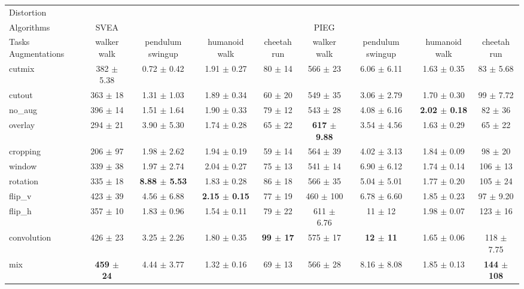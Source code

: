 \begin{tabular}{lcccccccc}
Distortion & & & & & & & & \\
Algorithms & SVEA & & & & PIEG & & & \\
Tasks Augmentations & walker walk & pendulum swingup & humanoid walk & cheetah run & walker walk & pendulum swingup & humanoid walk & cheetah run \\
cutmix          & 382 $\pm$ 5.38 & 0.72 $\pm$ 0.42 & 1.91 $\pm$ 0.27 & 80 $\pm$ 14 & 566 $\pm$ 23 & 6.06 $\pm$ 6.11 & 1.63 $\pm$ 0.35 & 83 $\pm$ 5.68 \\
cutout          & 363 $\pm$ 18 & 1.31 $\pm$ 1.03 & 1.89 $\pm$ 0.34 & 60 $\pm$ 20 & 549 $\pm$ 35 & 3.06 $\pm$ 2.79 & 1.70 $\pm$ 0.30 & 99 $\pm$ 7.72 \\
no\_aug         & 396 $\pm$ 14 & 1.51 $\pm$ 1.64 & 1.90 $\pm$ 0.33 & 79 $\pm$ 12 & 543 $\pm$ 28 & 4.08 $\pm$ 6.16 & \textbf{2.02 $\pm$ 0.18} & 82 $\pm$ 36 \\
overlay         & 294 $\pm$ 21 & 3.90 $\pm$ 5.30 & 1.74 $\pm$ 0.28 & 65 $\pm$ 22 & \textbf{617 $\pm$ 9.88} & 3.54 $\pm$ 4.56 & 1.63 $\pm$ 0.29 & 65 $\pm$ 22 \\
cropping        & 206 $\pm$ 97 & 1.98 $\pm$ 2.62 & 1.94 $\pm$ 0.19 & 59 $\pm$ 14 & 564 $\pm$ 39 & 4.02 $\pm$ 3.13 & 1.84 $\pm$ 0.09 & 98 $\pm$ 20 \\
window          & 339 $\pm$ 38 & 1.97 $\pm$ 2.74 & 2.04 $\pm$ 0.27 & 75 $\pm$ 13 & 541 $\pm$ 14 & 6.90 $\pm$ 6.12 & 1.74 $\pm$ 0.14 & 106 $\pm$ 13 \\
rotation        & 335 $\pm$ 18 & \textbf{8.88 $\pm$ 5.53} & 1.83 $\pm$ 0.28 & 86 $\pm$ 18 & 566 $\pm$ 35 & 5.04 $\pm$ 5.01 & 1.77 $\pm$ 0.20 & 105 $\pm$ 24 \\
flip\_v         & 423 $\pm$ 39 & 4.56 $\pm$ 6.88 & \textbf{2.15 $\pm$ 0.15} & 77 $\pm$ 19 & 460 $\pm$ 100 & 6.78 $\pm$ 6.60 & 1.85 $\pm$ 0.23 & 97 $\pm$ 9.20 \\
flip\_h         & 357 $\pm$ 10 & 1.83 $\pm$ 0.96 & 1.54 $\pm$ 0.11 & 79 $\pm$ 22 & 611 $\pm$ 6.76 & 11 $\pm$ 12 & 1.98 $\pm$ 0.07 & 123 $\pm$ 16 \\
convolution     & 426 $\pm$ 23 & 3.25 $\pm$ 2.26 & 1.80 $\pm$ 0.35 & \textbf{99 $\pm$ 17} & 575 $\pm$ 17 & \textbf{12 $\pm$ 11} & 1.65 $\pm$ 0.06 & 118 $\pm$ 7.75 \\
mix             & \textbf{459 $\pm$ 24} & 4.44 $\pm$ 3.77 & 1.32 $\pm$ 0.16 & 69 $\pm$ 13 & 566 $\pm$ 28 & 8.16 $\pm$ 8.08 & 1.85 $\pm$ 0.13 & \textbf{144 $\pm$ 108} \\
\end{tabular}
